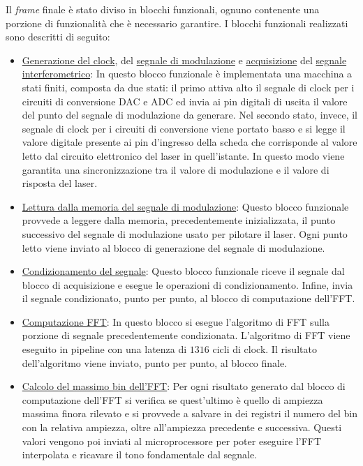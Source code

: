 Il \textit{frame} finale è stato diviso in blocchi funzionali, ognuno contenente una porzione di funzionalità che è necessario garantire. I blocchi funzionali realizzati sono descritti di seguito:
\begin{itemize}
	\item \underline{Generazione del clock}, del \underline{segnale di modulazione} e \underline{acquisizione} del \underline{segnale interferometrico}: In questo blocco funzionale è implementata una macchina a stati finiti, composta da due stati: il primo attiva alto il segnale di clock per i circuiti di conversione DAC e ADC ed invia ai pin digitali di uscita il valore del punto del segnale di modulazione da generare. Nel secondo stato, invece, il segnale di clock per i circuiti di conversione viene portato basso e si legge il valore digitale presente ai pin d'ingresso della scheda che corrisponde al valore letto dal circuito elettronico del laser in quell'istante. In questo modo viene garantita una sincronizzazione tra il valore di modulazione e il valore di risposta del laser.
	\item \underline{Lettura dalla memoria del segnale di modulazione}: Questo blocco funzionale provvede a leggere dalla memoria, precedentemente inizializzata, il punto successivo del segnale di modulazione usato per pilotare il laser. Ogni punto letto viene inviato al blocco di generazione del segnale di modulazione.
	\item \underline{Condizionamento del segnale}: Questo blocco funzionale riceve il segnale dal blocco di acquisizione e esegue le operazioni di condizionamento. Infine, invia il segnale condizionato, punto per punto, al blocco di computazione dell'FFT.
	\item \underline{Computazione FFT}: In questo blocco si esegue l'algoritmo di FFT sulla porzione di segnale precedentemente condizionata. L'algoritmo di FFT viene eseguito in pipeline con una latenza di $1316$ cicli di clock. Il risultato dell'algoritmo viene inviato, punto per punto, al blocco finale.
	\item \underline{Calcolo del massimo bin dell'FFT}: Per ogni risultato generato dal blocco di computazione dell'FFT si verifica se quest'ultimo è quello di ampiezza massima finora rilevato e si provvede a salvare in dei registri il numero del bin con la relativa ampiezza, oltre all'ampiezza precedente e successiva. Questi valori vengono poi inviati al microprocessore per poter eseguire l'FFT interpolata e ricavare il tono fondamentale dal segnale.
\end{itemize}

